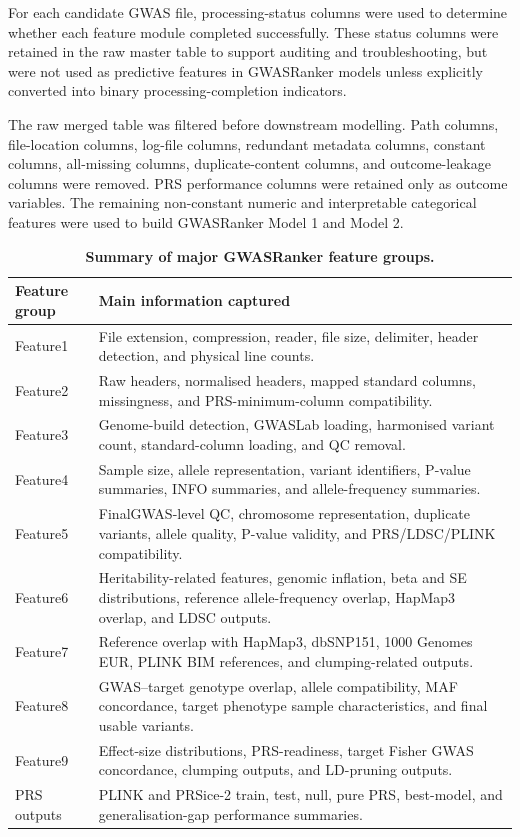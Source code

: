 \documentclass[11pt,a4paper]{article}
\begin{document}
For each candidate GWAS file, processing-status columns were used to determine whether each feature module completed successfully. These status columns were retained in the raw master table to support auditing and troubleshooting, but were not used as predictive features in GWASRanker models unless explicitly converted into binary processing-completion indicators.

The raw merged table was filtered before downstream modelling. Path columns, file-location columns, log-file columns, redundant metadata columns, constant columns, all-missing columns, duplicate-content columns, and outcome-leakage columns were removed. PRS performance columns were retained only as outcome variables. The remaining non-constant numeric and interpretable categorical features were used to build GWASRanker Model 1 and Model 2.

\begin{table}[H]
\centering
\caption{\textbf{Summary of major GWASRanker feature groups.}}
\label{tab}
\begin{tabular}{p{}p{}}
\toprule
\textbf{Feature group} & \textbf{Main information captured} \\
\midrule
Feature1 & File extension, compression, reader, file size, delimiter, header detection, and physical line counts. \\
Feature2 & Raw headers, normalised headers, mapped standard columns, missingness, and PRS-minimum-column compatibility. \\
Feature3 & Genome-build detection, GWASLab loading, harmonised variant count, standard-column loading, and QC removal. \\
Feature4 & Sample size, allele representation, variant identifiers, P-value summaries, INFO summaries, and allele-frequency summaries. \\
Feature5 & FinalGWAS-level QC, chromosome representation, duplicate variants, allele quality, P-value validity, and PRS/LDSC/PLINK compatibility. \\
Feature6 & Heritability-related features, genomic inflation, beta and SE distributions, reference allele-frequency overlap, HapMap3 overlap, and LDSC outputs. \\
Feature7 & Reference overlap with HapMap3, dbSNP151, 1000 Genomes EUR, PLINK BIM references, and clumping-related outputs. \\
Feature8 & GWAS--target genotype overlap, allele compatibility, MAF concordance, target phenotype sample characteristics, and final usable variants. \\
Feature9 & Effect-size distributions, PRS-readiness, target Fisher GWAS concordance, clumping outputs, and LD-pruning outputs. \\
PRS outputs & PLINK and PRSice-2 train, test, null, pure PRS, best-model, and generalisation-gap performance summaries. \\
\bottomrule
\end{tabular}
\end{table}
\end{document}
